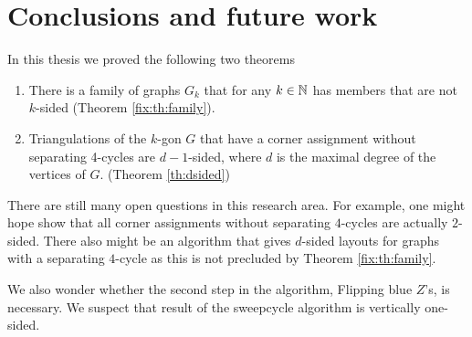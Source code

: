 
\section{Conclusions and future work}

In this thesis we proved the following two theorems

\begin{enumerate}
  \item There is a family of graphs $G_k$ that for any $k \in \mathbb{N}$ has members that are not $k$-sided (Theorem \ref{fix:th:family}).
  \item Triangulations of the $k$-gon $G$ that have a corner assignment without separating 4-cycles are $d-1$-sided, where $d$ is the maximal degree of the vertices of $G$. (Theorem \ref{th:dsided})
\end{enumerate}

There are still many open questions in this research area. For example, one might hope show that all corner assignments without separating $4$-cycles are actually $2$-sided.
There also might be an algorithm that gives $d$-sided layouts for graphs with a separating $4$-cycle as this is not precluded by Theorem \ref{fix:th:family}.

We also wonder whether the second step in the algorithm, Flipping blue $Z$'s, is necessary.
We suspect that result of the sweepcycle algorithm is vertically one-sided.

